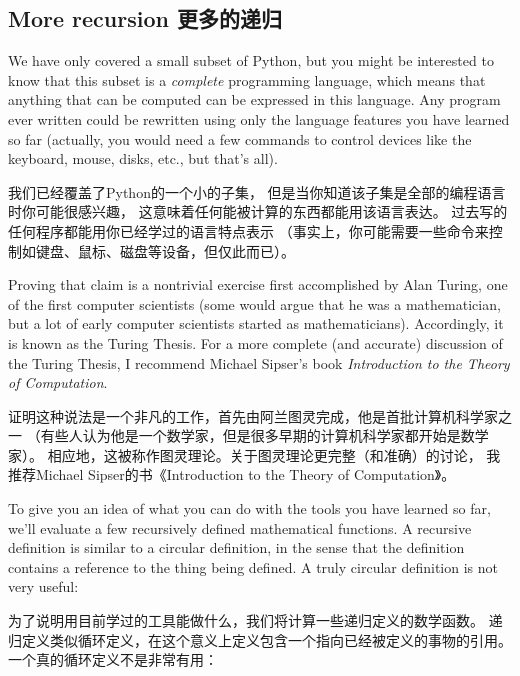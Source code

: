 \documentclass[10pt]{book}
\begin{document}
\begin{CJK}{UTF8}{gbsn}
\section{More recursion 更多的递归}
\label{more.recursion}

We have only covered a small subset of Python, but you might
be interested to know that this subset is a {\em complete}
programming language, which means that anything that can be
computed can be expressed in this language.  Any program ever written
could be rewritten using only the language features you have learned
so far (actually, you would need a few commands to control devices
like the keyboard, mouse, disks, etc., but that's all).

我们已经覆盖了Python的一个小的子集，
但是当你知道该子集是全部的编程语言时你可能很感兴趣，
这意味着任何能被计算的东西都能用该语言表达。
过去写的任何程序都能用你已经学过的语言特点表示
（事实上，你可能需要一些命令来控制如键盘、鼠标、磁盘等设备，但仅此而已）。

Proving that claim is a nontrivial exercise first accomplished by Alan
Turing, one of the first computer scientists (some would argue that he
was a mathematician, but a lot of early computer scientists started as
mathematicians).  Accordingly, it is known as the Turing Thesis.
For a more complete (and accurate) discussion of the Turing Thesis,
I recommend Michael Sipser's book {\em Introduction to the
Theory of Computation}.

证明这种说法是一个非凡的工作，首先由阿兰图灵完成，他是首批计算机科学家之一
（有些人认为他是一个数学家，但是很多早期的计算机科学家都开始是数学家）。
相应地，这被称作图灵理论。关于图灵理论更完整（和准确）的讨论，
我推荐Michael Sipser的书《Introduction to the Theory of Computation》。

To give you an idea of what you can do with the tools you have learned
so far, we'll evaluate a few recursively defined mathematical
functions.  A recursive definition is similar to a circular
definition, in the sense that the definition contains a reference to
the thing being defined.  A truly circular definition is not very
useful:

为了说明用目前学过的工具能做什么，我们将计算一些递归定义的数学函数。
递归定义类似循环定义，在这个意义上定义包含一个指向已经被定义的事物的引用。
一个真的循环定义不是非常有用：

\begin{description}


\end{description}
\end{CJK}
\end{document}

